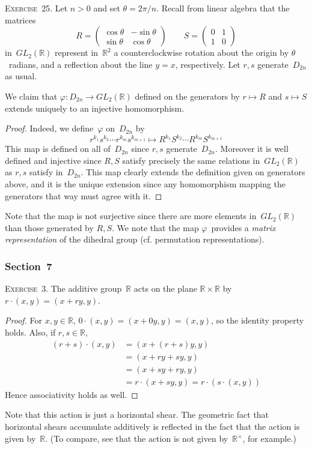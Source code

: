 \documentclass[letterpaper]{article}
\newcommand{\exercise}[1]{\goodbreak\noindent\textsc{Exercise~{#1}.}}
\newcommand{\R}{\mathbb{R}}
\newcommand{\mi}[1]{{#1}{}^{\times}}
\begin{document}
\exercise{25}
Let $n>0$ and set $\theta=2\pi/n$. Recall from linear algebra that the matrices
$$R=\left(\begin{matrix}
\cos\theta&-\sin\theta\\
\sin\theta&\cos\theta\end{matrix}\right)\qquad
S=\left(\begin{matrix}
0&1\\
1&0\end{matrix}\right)$$
in~$GL_2(\R)$ represent in~$\R^2$ a counterclockwise rotation about the origin by $\theta$~radians, and a reflection about the line $y=x$, respectively. Let $r,s$ generate~$D_{2n}$ as usual.

We claim that $\varphi:D_{2n}\to GL_2(\R)$ defined on the generators by $r\mapsto R$ and $s\mapsto S$ extends uniquely to an injective homomorphism.
\begin{proof}
Indeed, we define~$\varphi$ on~$D_{2n}$ by
$$r^{k_1}s^{k_2}\cdots r^{k_m}s^{k_{m+1}}\mapsto R^{k_1}S^{k_2}\cdots R^{k_m}S^{k_{m+1}}$$
This map is defined on all of~$D_{2n}$ since $r,s$ generate~$D_{2n}$. Moreover it is well defined and injective since $R,S$ satisfy precisely the same relations in~$GL_2(\R)$ as $r,s$ satisfy in~$D_{2n}$. This map clearly extends the definition given on generators above, and it is the unique extension since any homomorphism mapping the generators that way must agree with it.
\end{proof}
\noindent Note that the map is not surjective since there are more elements in~$GL_2(\R)$ than those generated by $R,S$. We note that the map $\varphi$~provides a \emph{matrix representation} of the dihedral group (cf. permutation representations).

\subsubsection*{Section~7}
\exercise{3}
The additive group~$\R$ acts on the plane $\R\times\R$ by $r\cdot(x,y)=(x+ry,y)$.
\begin{proof}
For $x,y\in\R$, $0\cdot(x,y)=(x+0y,y)=(x,y)$, so the identity property holds. Also, if $r,s\in\R$,
\begin{align*}
(r+s)\cdot(x,y)&=(x+(r+s)y,y)\\
	&=(x+ry+sy,y)\\
	&=(x+sy+ry,y)\\
	&=r\cdot(x+sy,y)=r\cdot(s\cdot(x,y))
\end{align*}
Hence associativity holds as well.
\end{proof}
\noindent Note that this action is just a horizontal shear. The geometric fact that horizontal shears accumulate additively is reflected in the fact that the action is given by~$\R$. (To compare, see that the action is not given by~$\mi{\R}$, for example.)
\end{document}
